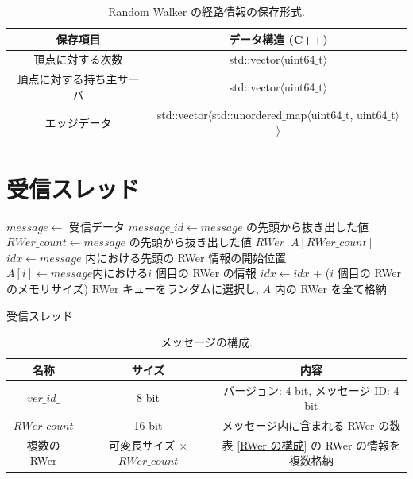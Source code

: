 \begin{table}[t]
    \caption{Random Walker の経路情報の保存形式.}
    \label{Random Walker の経路情報の保存形式}
    \centering
    \begin{tabular}{cc}
        \hline
        保存項目  &  データ構造 (C++)  \\
        \hline \hline
        頂点に対する次数  &  std::vector$\langle$uint64$\_$t$\rangle$ \\
        \hline
        頂点に対する持ち主サーバ  &  std::vector$\langle$uint64$\_$t$\rangle$  \\
        \hline
        エッジデータ  &  std::vector$\langle$std::unordered$\_$map$\langle$uint64$\_$t, uint64$\_$t$\rangle$$\rangle$ \\
        \hline
    \end{tabular}
\end{table}

\section{受信スレッド}

\begin{algorithm}[t]
\DontPrintSemicolon
\nl $message \leftarrow$ 受信データ\;
\nl $message\_id \leftarrow message$ の先頭から抜き出した値\;
\nl {} {
\nl     $RWer\_count \leftarrow message$ の先頭から抜き出した値\;
\nl     $RWer \;\; A[RWer\_count]$\;
\nl     $idx \leftarrow message$ 内における先頭の RWer 情報の開始位置\;
\nl     {} {
\nl         $A[i] \leftarrow message 内における i$ 個目の RWer の情報\;
\nl         $idx \leftarrow idx$ + ($i$ 個目の RWer のメモリサイズ)\;}
\nl     RWer キューをランダムに選択し, $A$ 内の RWer を全て格納\;}
\nl {}
\caption{{受信スレッド} \label{受信スレッド}}
\end{algorithm}

\begin{table}[t!]
    \caption{メッセージの構成.}
    \label{メッセージの構成}
    \centering
    \begin{tabular}{ccc}
        \hline
        名称  &  サイズ  &  内容 \\
        \hline \hline
        $ver\_id\_$  &  8 bit  &  バージョン: 4 bit, メッセージ ID: 4 bit \\
        \hline
        $RWer\_count$  &  16 bit  &  メッセージ内に含まれる RWer の数 \\
        \hline
        複数の RWer  &  可変長サイズ $\times$ $RWer\_count$  &  表 \ref{RWer の構成} の RWer の情報を複数格納 \\
        \hline
    \end{tabular}
\end{table}

